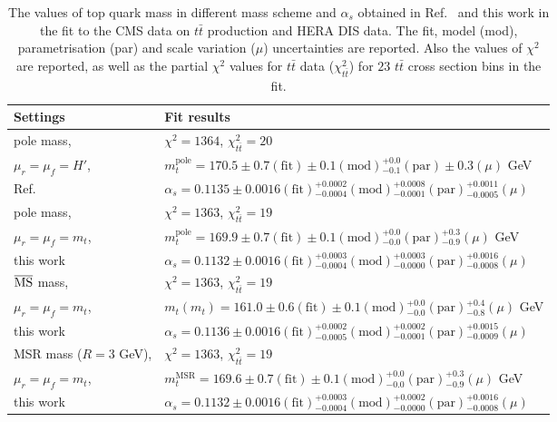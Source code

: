 \documentclass[12pt,a4paper]{article}
\newcommand{\msbar}{\ensuremath{\overline{\rm MS}}\xspace}
\newcommand{\polem}[1][]{\ensuremath{m_{#1}^{\text{pole}}}\xspace}
\newcommand{\msbarm}[1][]{\ensuremath{m_{#1}(m_{#1})}\xspace}
\newcommand{\msrm}[1][]{\ensuremath{m_{#1}^{\text{MSR}}}\xspace}
\begin{document}
\begin{table}
    \setlength{\tabcolsep}{3pt}
    \renewcommand{\arraystretch}{1.35}
    \begin{tabular}{|l|l|}
        \hline
        Settings & Fit results \\
        \hline
        
        pole mass, & $\chi^2 = 1364$, $\chi^2_{t\bar{t}} = 20$\\
        $\mu_r = \mu_f = H'$, & $\polem[t] = 170.5 \pm 0.7 (\text{fit}) \pm 0.1 (\text{mod}) {}^{+0.0}_{-0.1} (\text{par}) \pm 0.3 (\mu)$ GeV \\
        Ref.~\cite{Sirunyan:2019zvx} & $\alpha_s = 0.1135 \pm 0.0016 (\text{fit}) {}^{+0.0002}_{-0.0004} (\text{mod}) {}^{+0.0008}_{-0.0001} (\text{par}) {}^{+0.0011}_{-0.0005} (\mu)$ \\
        \hline
        
        pole mass, & $\chi^2 = 1363$, $\chi^2_{t\bar{t}} = 19$\\
        $\mu_r = \mu_f = m_t$, & $\polem[t] = 169.9 \pm 0.7 (\text{fit}) \pm 0.1 (\text{mod}) {}^{+0.0}_{-0.0} (\text{par}) {}^{+0.3}_{-0.9} (\mu)$ GeV \\
        this work & $\alpha_s = 0.1132 \pm 0.0016 (\text{fit}) {}^{+0.0003}_{-0.0004} (\text{mod}) {}^{+0.0003}_{-0.0000} (\text{par}) {}^{+0.0016}_{-0.0008} (\mu)$ \\
        \hline
        
        \msbar mass, & $\chi^2 = 1363$, $\chi^2_{t\bar{t}} = 19$\\
        $\mu_r = \mu_f = m_t$, & $\msbarm[t] = 161.0 \pm 0.6 (\text{fit}) \pm 0.1 (\text{mod}) {}^{+0.0}_{-0.0} (\text{par}) {}^{+0.4}_{-0.8} (\mu)$ GeV \\
        this work & $\alpha_s = 0.1136 \pm 0.0016 (\text{fit}) {}^{+0.0002}_{-0.0005} (\text{mod}) {}^{+0.0002}_{-0.0001} (\text{par}) {}^{+0.0015}_{-0.0009} (\mu)$ \\
        \hline
        
        MSR mass ($R=3$ GeV), & $\chi^2 = 1363$, $\chi^2_{t\bar{t}} = 19$\\
        $\mu_r = \mu_f = m_t$, & $\msrm[t] = 169.6 \pm 0.7 (\text{fit}) \pm 0.1 (\text{mod}) {}^{+0.0}_{-0.0} (\text{par}) {}^{+0.3}_{-0.9} (\mu)$ GeV \\
        this work & $\alpha_s = 0.1132 \pm 0.0016 (\text{fit}) {}^{+0.0003}_{-0.0004} (\text{mod}) {}^{+0.0002}_{-0.0000} (\text{par}) {}^{+0.0016}_{-0.0008} (\mu)$ \\
        
        \hline
    \end{tabular}
    \caption{The values of top quark mass in different mass scheme and $\alpha_s$ obtained in Ref.~\cite{Sirunyan:2019zvx} and this work in the fit to the CMS data on $t\bar{t}$ production and HERA DIS data. The fit, model (mod), parametrisation (par) and scale variation ($\mu$) uncertainties are reported. Also the values of $\chi^2$ are reported, as well as the partial $\chi^2$ values for $t\bar{t}$ data ($\chi^2_{t\bar{t}}$) for $23$ $t\bar{t}$ cross section bins in the fit.}
    \label{tab:mtfit}
\end{table}
\end{document}

